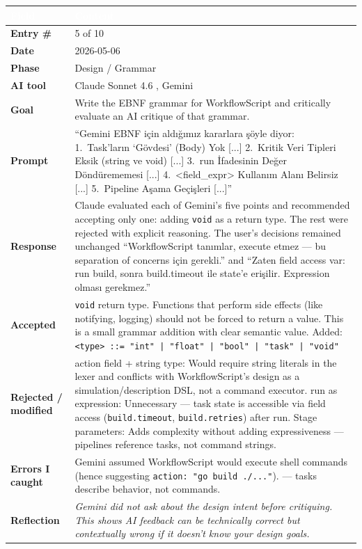 \documentclass[a4paper,10pt]{article}
\begin{document}
\begin{tabular}{|
    >{\bfseries}m{3.5cm}|
    m{10cm}|
}
\hline
\rowcolor{headerblue}
\textcolor{white}{Field} & \textcolor{white}{\textbf{Content}} \\
\hline
\rowcolor{white}
Entry \#        & 5 of 10 \\
\hline
\rowcolor{altrow}
Date            & 2026-05-06 \\
\hline
\rowcolor{white}
Phase           & Design / Grammar \\
\hline
\rowcolor{altrow}
AI tool         & Claude Sonnet 4.6 , Gemini \\
\hline
\rowcolor{white}
Goal            & Write the EBNF grammar for WorkflowScript and critically evaluate an AI critique of that grammar. \\
\hline
\rowcolor{altrow}
Prompt          & ``Gemini EBNF için aldığımız kararlara şöyle diyor: 1.~Task'ların `Gövdesi' (Body) Yok [...] 2.~Kritik Veri Tipleri Eksik (string ve void) [...] 3.~run İfadesinin Değer Döndürememesi [...] 4.~<field\_expr> Kullanım Alanı Belirsiz [...] 5.~Pipeline Aşama Geçişleri [...]'' \\
\hline
\rowcolor{white}
Response & Claude evaluated each of Gemini's five points and recommended accepting only one: adding \texttt{void} as a return type. The rest were rejected with explicit reasoning. The user's decisions remained unchanged ``WorkflowScript tanımlar, execute etmez --- bu separation of concerns için gerekli.'' and ``Zaten field access var: run build, sonra build.timeout ile state'e erişilir. Expression olması gerekmez.'' \\
\hline
\rowcolor{altrow}
Accepted        & \texttt{void} return type. Functions that perform side effects (like notifying, logging) should not be forced to return a value. This is a small grammar addition with clear semantic value. Added: \texttt{<type> ::= "int" | "float" | "bool" | "task" | "void"} \\
\hline
\rowcolor{white}
Rejected / modified & action field + string type: Would require string literals in the lexer and conflicts with WorkflowScript's design as a simulation/description DSL, not a command executor. run as expression: Unnecessary --- task state is accessible via field access (\texttt{build.timeout}, \texttt{build.retries}) after run. Stage parameters: Adds complexity without adding expressiveness --- pipelines reference tasks, not command strings. \\
\hline
\rowcolor{altrow}
Errors I caught   & Gemini assumed WorkflowScript would execute shell commands (hence suggesting \texttt{action: "go build ./..."}). --- tasks describe behavior, not commands. \\
\hline
\rowcolor{white}
Reflection & \textit{Gemini did not ask about the design intent before critiquing. This shows AI feedback can be technically correct but contextually wrong if it doesn't know your design goals.} \\
\hline
\end{tabular}
\end{document}
